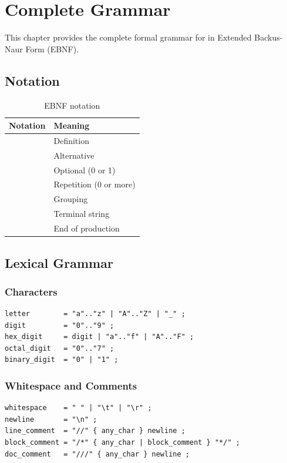\chapter{Complete Grammar}
\label{ch:grammar}

This chapter provides the complete formal grammar for \haira{} in Extended Backus-Naur Form (EBNF).

\section{Notation}

\begin{table}[h]
\centering
\begin{tabular}{ll}
\toprule
\textbf{Notation} & \textbf{Meaning} \\
\midrule
\code{=} & Definition \\
\code{|} & Alternative \\
\code{[ ... ]} & Optional (0 or 1) \\
\code{\{ ... \}} & Repetition (0 or more) \\
\code{( ... )} & Grouping \\
\code{"..."} & Terminal string \\
\code{;} & End of production \\
\bottomrule
\end{tabular}
\caption{EBNF notation}
\end{table}

\section{Lexical Grammar}

\subsection{Characters}

\begin{lstlisting}[language=EBNF]
letter        = "a".."z" | "A".."Z" | "_" ;
digit         = "0".."9" ;
hex_digit     = digit | "a".."f" | "A".."F" ;
octal_digit   = "0".."7" ;
binary_digit  = "0" | "1" ;
\end{lstlisting}

\subsection{Whitespace and Comments}

\begin{lstlisting}[language=EBNF]
whitespace    = " " | "\t" | "\r" ;
newline       = "\n" ;
line_comment  = "//" { any_char } newline ;
block_comment = "/*" { any_char | block_comment } "*/" ;
doc_comment   = "///" { any_char } newline ;
\end{lstlisting}

